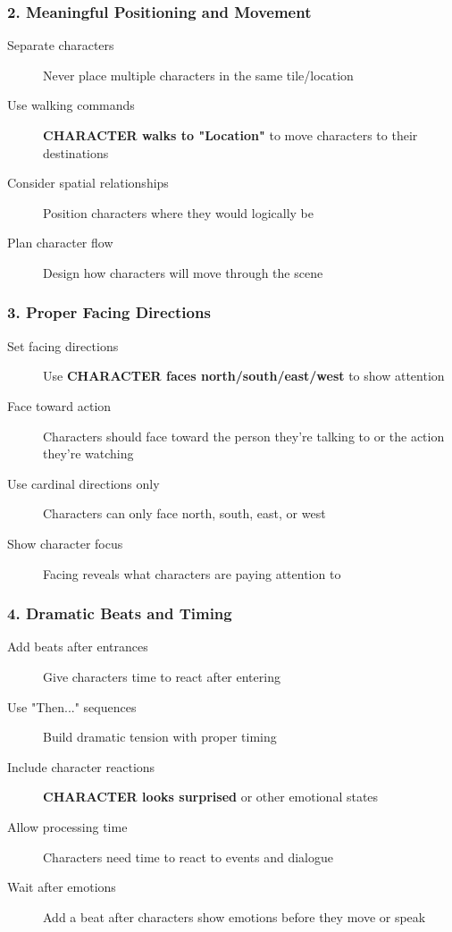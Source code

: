 \documentclass[11pt,letterpaper,oldstylefigures]{memoir}
\newcommand{\fountain}[1]{\textbf{#1}}
\begin{document}
\subsubsection{2. Meaningful Positioning and Movement}
\begin{description}
\item[Separate characters] Never place multiple characters in the same tile/location
\item[Use walking commands] \fountain{CHARACTER walks to "Location"} to move characters to their destinations
\item[Consider spatial relationships] Position characters where they would logically be
\item[Plan character flow] Design how characters will move through the scene
\end{description}


\subsubsection{3. Proper Facing Directions}
\begin{description}
\item[Set facing directions] Use \fountain{CHARACTER faces north/south/east/west} to show attention
\item[Face toward action] Characters should face toward the person they're talking to or the action they're watching
\item[Use cardinal directions only] Characters can only face north, south, east, or west
\item[Show character focus] Facing reveals what characters are paying attention to
\end{description}


\subsubsection{4. Dramatic Beats and Timing}
\begin{description}
\item[Add beats after entrances] Give characters time to react after entering
\item[Use "Then..." sequences] Build dramatic tension with proper timing
\item[Include character reactions] \fountain{CHARACTER looks surprised} or other emotional states
\item[Allow processing time] Characters need time to react to events and dialogue
\item[Wait after emotions] Add a beat after characters show emotions before they move or speak
\end{description}
\end{document}
